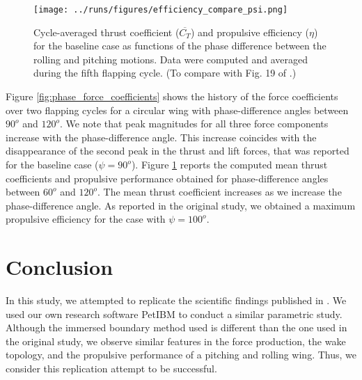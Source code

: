 \begin{figure}
  \centering
  \texttt{[image: ../runs/figures/efficiency\_compare\_psi.png]}
  \caption{Cycle-averaged thrust coefficient ($\overline{C_T}$) and propulsive efficiency ($\eta$) for the baseline case as functions of the phase difference between the rolling and pitching motions. Data were computed and averaged during the fifth flapping cycle. (To compare with Fig. 19 of \citet{li_dong_2016}.)}
  \label{fig:phase_efficiency}
\end{figure}

Figure \ref{fig:phase_force_coefficients} shows the history of the force coefficients over two flapping cycles for a circular wing with phase-difference angles between $90^o$ and $120^o$.
We note that peak magnitudes for all three force components increase with the phase-difference angle.
This increase coincides with the disappearance of the second peak in the thrust and lift forces, that was reported for the baseline case ($\psi = 90^o$).
Figure \ref{fig:phase_efficiency} reports the computed mean thrust coefficients and propulsive performance obtained for phase-difference angles between $60^o$ and $120^o$.
The mean thrust coefficient increases as we increase the phase-difference angle.
As reported in the original study, we obtained a maximum propulsive efficiency for the case with $\psi = 100^o$.

\section{Conclusion}

In this study, we attempted to replicate the scientific findings published in \citet{li_dong_2016}.
We used our own research software PetIBM\cite{chuang_et_al_2018} to conduct a similar parametric study.
Although the immersed boundary method used is different than the one used in the original study, we observe similar features in the force production, the wake topology, and the propulsive performance of a pitching and rolling wing.
Thus, we consider this replication attempt to be successful.

